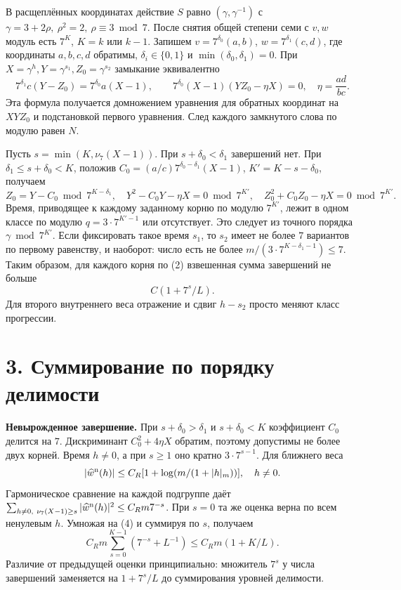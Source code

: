 \documentclass[11pt,a4paper]{article}
\newcommand{\sect}[1]{\section*{\sffamily\color{ink}#1}}
\newcommand{\subt}[1]{\par\medskip\noindent\textbf{#1.}\quad}
\begin{document}
В расщеплённых координатах действие \(S\) равно \((\gamma,\gamma^{-1})\) с \(\gamma=3+2\rho,\ \rho^2=2,\ \rho\equiv3\bmod7\). После снятия общей степени семи с \(v,w\) модуль есть \(7^K\), \(K=k\) или \(k-1\). Запишем \(v=7^{\delta_0}(a,b)\), \(w=7^{\delta_1}(c,d)\), где координаты \(a,b,c,d\) обратимы, \(\delta_i\in\{0,1\}\) и \(\min(\delta_0,\delta_1)=0\). При \(X=\gamma^h,Y=\gamma^{s_1},Z_0=\gamma^{s_2}\) замыкание эквивалентно
\begin{equation}
  7^{\delta_1}c(Y-Z_0)=7^{\delta_0}a(X-1),\qquad
  7^{\delta_0}(X-1)(YZ_0-\eta X)=0,\quad
                  \eta=\frac{ad}{bc}.
                                                               \tag{3}
\end{equation}
Эта формула получается домножением уравнения для обратных координат на \(XYZ_0\) и подстановкой первого уравнения. След каждого замкнутого слова по модулю равен \(N\).

Пусть \(s=\min(K,\nu_7(X-1))\). При \(s+\delta_0<\delta_1\) завершений нет. При \(\delta_1\le s+\delta_0<K\), положив
\(C_0=(a/c)7^{\delta_0-\delta_1}(X-1)\), \(K'=K-s-\delta_0\), получаем
\[
 Z_0=Y-C_0\bmod7^{K-\delta_1},\quad
 Y^2-C_0Y-\eta X=0\bmod7^{K'},\quad
 Z_0^2+C_0 Z_0-\eta X=0\bmod7^{K'}.
\]
Время, приводящее к каждому заданному корню по модулю \(7^{K'}\), лежит в одном классе по модулю \(q=3\cdot 7^{K'-1}\) или отсутствует. Это следует из точного порядка \(\gamma\bmod 7^{K'}\). Если фиксировать такое время \(s_1\), то \(s_2\) имеет не более \(7\) вариантов по первому равенству, и наоборот: число есть не более \(m/(3\cdot7^{K-\delta_1-1})\le7\). Таким образом, для каждого корня по (2) взвешенная сумма завершений не больше
\begin{equation}
                        C(1+7^s/L).
                                                               \tag{4}
\end{equation}
Для второго внутреннего веса отражение и сдвиг \(h-s_2\) просто меняют класс прогрессии.
\newpage
\sect{3. Суммирование по порядку делимости}
\subt{Невырожденное завершение}
При \(s+\delta_0>\delta_1\) и \(s+\delta_0<K\) коэффициент \(C_0\) делится на \(7\). Дискриминант \(C_0^2+4\eta X\) обратим, поэтому допустимы не более двух корней. Время \(h\ne0\), а при \(s\ge1\) оно кратно \(3\cdot7^{s-1}\). Для ближнего веса
\[
       |\widehat w^{\rm n}(h)|\le C_R[1+\log(m/(1+|h|_m))],
                       \quad h\ne0.
\]
Гармоническое сравнение на каждой подгруппе даёт \(\sum_{h\ne0,\ \nu_7(X-1)\ge s}|\widehat w^{\rm n}(h)|^2\le C_Rm7^{-s}\). При \(s=0\) та же оценка верна по всем ненулевым \(h\). Умножая на (4) и суммируя по \(s\), получаем
\[
                  C_R m\sum_{s=0}^{K-1}(7^{-s}+L^{-1})
                                     \le C_R m(1+K/L).
\]
Различие от предыдущей оценки принципиально: множитель \(7^s\) у числа завершений заменяется на \(1+7^s/L\) до суммирования уровней делимости.
\end{document}
